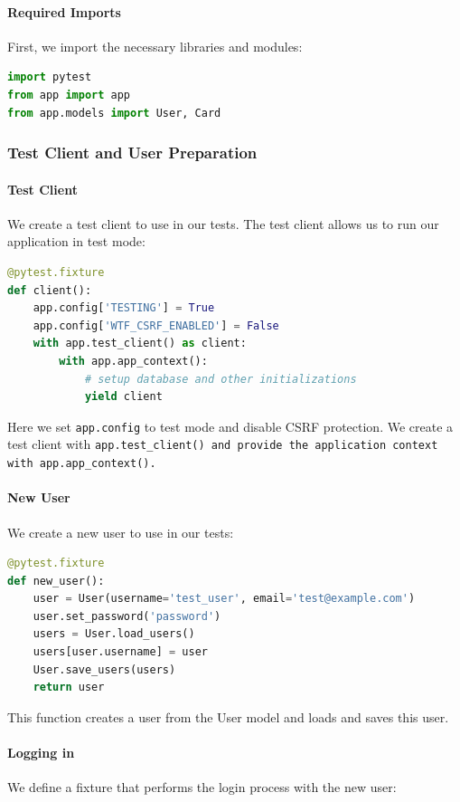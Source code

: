 \paragraph{Required Imports}
First, we import the necessary libraries and modules:

\begin{lstlisting}[language=Python]
import pytest
from app import app
from app.models import User, Card
\end{lstlisting}\newpage


\subsubsection{Test Client and User Preparation}

\paragraph{Test Client}
We create a test client to use in our tests. The test client allows us to run our application in test mode:

\begin{lstlisting}[language=Python]
@pytest.fixture
def client():
    app.config['TESTING'] = True
    app.config['WTF_CSRF_ENABLED'] = False
    with app.test_client() as client:
        with app.app_context():
            # setup database and other initializations
            yield client
\end{lstlisting}

Here we set \texttt{app.config} to test mode and disable CSRF protection. We create a test client with \texttt{app.test\_client() and provide the application context with \texttt{app.app\_context()}.
}

\paragraph{New User}
We create a new user to use in our tests:

\begin{lstlisting}[language=Python]
@pytest.fixture
def new_user():
    user = User(username='test_user', email='test@example.com')
    user.set_password('password')
    users = User.load_users()
    users[user.username] = user
    User.save_users(users)
    return user
\end{lstlisting}

This function creates a user from the User model and loads and saves this user.

\paragraph{Logging in}
We define a fixture that performs the login process with the new user:

